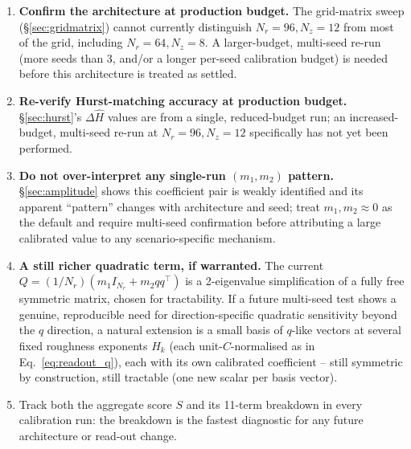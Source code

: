 \documentclass[11pt,a4paper]{article}
\begin{document}
\begin{enumerate}[itemsep=2pt]
\item \textbf{Confirm the architecture at production budget.} The
grid-matrix sweep (\S\ref{sec:gridmatrix}) cannot currently distinguish
$N_r=96,N_z=12$ from most of the grid, including $N_r=64,N_z=8$. A
larger-budget, multi-seed re-run (more seeds than 3, and/or a longer
per-seed calibration budget) is needed before this architecture is
treated as settled.
\item \textbf{Re-verify Hurst-matching accuracy at production budget.}
\S\ref{sec:hurst}'s $\Delta\hat H$ values are from a single,
reduced-budget run; an increased-budget, multi-seed re-run at
$N_r=96,N_z=12$ specifically has not yet been performed.
\item \textbf{Do not over-interpret any single-run $(m_1,m_2)$
pattern.} \S\ref{sec:amplitude} shows this coefficient pair is weakly
identified and its apparent ``pattern'' changes with architecture and
seed; treat $m_1,m_2\approx0$ as the default and require multi-seed
confirmation before attributing a large calibrated value to any
scenario-specific mechanism.
\item \textbf{A still richer quadratic term, if warranted.} The
current $Q=(1/N_r)(m_1I_{N_r}+m_2qq^\top)$ is a 2-eigenvalue
simplification of a fully free symmetric matrix, chosen for
tractability. If a future multi-seed test shows a genuine,
reproducible need for direction-specific quadratic sensitivity beyond
the $q$ direction, a natural extension is a small basis of $q$-like
vectors at several fixed roughness exponents $H_k$ (each
unit-$C$-normalised as in Eq.~\eqref{eq:readout_q}), each with its own
calibrated coefficient -- still symmetric by construction, still
tractable (one new scalar per basis vector).
\item Track both the aggregate score $S$ and its 11-term breakdown in
every calibration run: the breakdown is the fastest diagnostic for any
future architecture or read-out change.
\end{enumerate}
\end{document}
